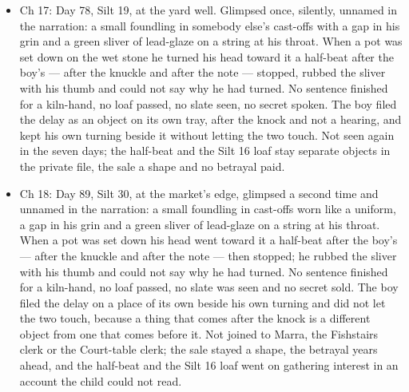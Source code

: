 \documentclass{design/chronicle}
\begin{document}
{\begin{itemize}[leftmargin=1.4em,itemsep=1pt,topsep=3pt,parsep=0pt]
\end{itemize}

\begin{itemize}[leftmargin=1.4em,itemsep=1pt,topsep=3pt,parsep=0pt]

\item Ch 17: Day 78, Silt 19, at the yard well. Glimpsed once, silently, unnamed in the narration: a small foundling in somebody else’s cast-offs with a gap in his grin and a green sliver of lead-glaze on a string at his throat. When a pot was set down on the wet stone he turned his head toward it a half-beat after the boy’s — after the knuckle and after the note — stopped, rubbed the sliver with his thumb and could not say why he had turned. No sentence finished for a kiln-hand, no loaf passed, no slate seen, no secret spoken. The boy filed the delay as an object on its own tray, after the knock and not a hearing, and kept his own turning beside it without letting the two touch. Not seen again in the seven days; the half-beat and the Silt 16 loaf stay separate objects in the private file, the sale a shape and no betrayal paid.

\end{itemize}

\begin{itemize}[leftmargin=1.4em,itemsep=1pt,topsep=3pt,parsep=0pt]

\item Ch 18: Day 89, Silt 30, at the market’s edge, glimpsed a second time and unnamed in the narration: a small foundling in cast-offs worn like a uniform, a gap in his grin and a green sliver of lead-glaze on a string at his throat. When a pot was set down his head went toward it a half-beat after the boy’s --- after the knuckle and after the note --- then stopped; he rubbed the sliver with his thumb and could not say why he had turned. No sentence finished for a kiln-hand, no loaf passed, no slate was seen and no secret sold. The boy filed the delay on a place of its own beside his own turning and did not let the two touch, because a thing that comes after the knock is a different object from one that comes before it. Not joined to Marra, the Fishstairs clerk or the Court-table clerk; the sale stayed a shape, the betrayal years ahead, and the half-beat and the Silt 16 loaf went on gathering interest in an account the child could not read.

\end{itemize}

\begin{itemize}[leftmargin=1.4em,itemsep=1pt,topsep=3pt,parsep=0pt]


\end{itemize}}
\end{document}
